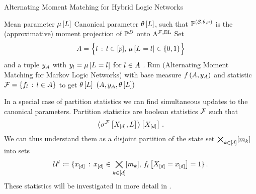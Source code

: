 \begin{algorithm}[hbt!]
    \caption{Alternating Moment Matching for Hybrid Logic Networks}\label{alg:AMM_HLN}
    \begin{algorithmic}
        \Require Mean parameter $\mu\left[L\right]$
        \Ensure Canonical parameter $\theta\left[L\right]$, such that $\mathbb{P}^{(\mathcal{S},\theta,\nu)}$ is the (approximative) moment projection of $\mathbb{P}^{D}$ onto $\Lambda^{\mathcal{F},\mathrm{EL}}$
        \iosepline
        \State Set
        \begin{align*}
            A = \Big\{ l \,:\, l\in[p] ,\, \mu\left[L_{}=l_{}\right]\in\{0,1\} \Big\}
        \end{align*}
        and a tuple $y_{A}$ with $y_{l}=\mu\left[L_{}=l_{}\right]$ for $l\in A$ .
        \State Run  (Alternating Moment Matching for Markov Logic Networks) with base measure $f\left(A,y_{A}\right)$ and statistic $\mathcal{F}=\{f_{l}\,:\,l\in A\}$ to get $\theta\left[L\right]$
        \State \Return $(A,y_{A},\theta\left[L\right])$
    \end{algorithmic}
\end{algorithm}



In a special case of partition statistics we can find simultaneous updates to the canonical parameters.
Partition statistics are boolean statistics $\mathcal{F}$ such that
\begin{align*}
    \left\langle \sigma^{\mathcal{F}}\left[X_{[d]},L\right]\right\rangle \left[ X_{[d]} \right] \, .
\end{align*}
We can thus understand them as a disjoint partition of the state set $\bigtimes_{k\in[d]}[m_{k}]$ into sets
\begin{align*}
    \mathcal{U}^{l} \coloneqq \{x_{[d]}\,:\,x_{[d]}\in\bigtimes_{k\in[d]}[m_{k}],\,f_{l}\left[X_{[d]}=x_{[d]}\right]=1\} \, .
\end{align*}
These statistics will be investigated in more detail in .


